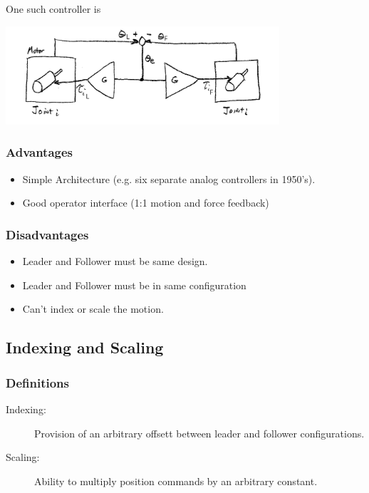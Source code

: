 One such controller is

\includegraphics[width=4.0in]{figs14/00403.jpg}



\subsubsection*{Advantages}
\begin{itemize}
   \item Simple Architecture (e.g. six separate analog controllers in 1950's).
   \item Good operator interface (1:1 motion and force feedback)
\end{itemize}

\subsubsection*{Disadvantages}
\begin{itemize}
   \item Leader and Follower must be same design.
   \item Leader and Follower must be in same configuration
   \item Can't index or scale the motion.
\end{itemize}


\subsection{Indexing and Scaling}
\subsubsection{Definitions}

\begin{description}
\item [Indexing:] Provision of an arbitrary offsett between leader and follower configurations.
\item [Scaling:]  Ability to multiply position commands by an arbitrary constant.
\end{description}


